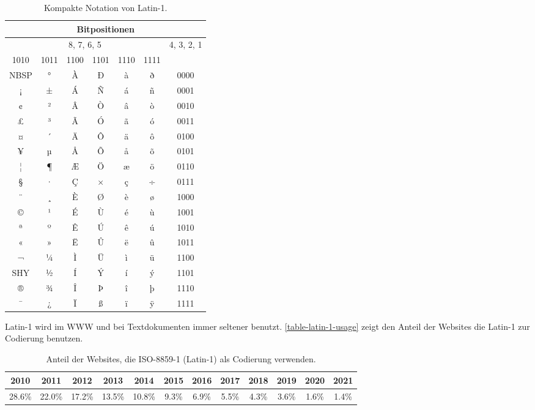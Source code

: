 \begin{table}[htb]
\centering
\begin{tabular}{|c|c|c|c|c|c||c|}
\hline
\multicolumn{7}{|c|}{Bitpositionen} \\ \hline
\multicolumn{6}{|c||}{8, 7, 6, 5} & 4, 3, 2, 1 \\ \hline \hline
1010 & 1011 & 1100 & 1101 & 1110 & 1111 & \\\hline
NBSP & ° & À & Ð & à & ð & 0000 \\ \hline 
¡   &  ±  &  Á   &  Ñ   &  á   &   ñ & 0001  \\ \hline 
¢   &  ²   &  Â   &   Ò  &   â  &   ò   & 0010   \\ \hline 
£   &  ³   &  Ã   &   Ó  &  ã   &    ó   & 0011    \\ \hline 
¤   &  ´   &  Ä   &   Ô  &  ä  &    ô  & 0100     \\ \hline 
¥   & µ    &  Å   &  Õ  &  å   &   õ    & 0101    \\ \hline 
¦   &   ¶  &  Æ   &  Ö  &  æ  &    ö   & 0110     \\ \hline 
§   &  ·   &  Ç   &  ×   &   ç  &   ÷   & 0111     \\ \hline 
¨   &  ¸   &   È  &   Ø  & è    &   ø    & 1000    \\ \hline 
©   &  ¹   &  É   &  Ù  &  é  &  ù   & 1001   \\ \hline 
ª   & º   & Ê   &  Ú  & ê   &  ú   & 1010       \\ \hline 
«   &  »   & Ë    &  Û   &  ë   &  û   & 1011      \\ \hline 
¬   &  ¼   & Ì    & Ü   & ì    &   ü   & 1100     \\ \hline 
SHY &  ½   &  Í   &  Ý   &  í   & ý   & 1101   \\ \hline 
®   &   ¾  &  Î   & Þ    &   î  &    þ   & 1110    \\ \hline 
¯   &  ¿   &  Ï   &  ß  &  ï   &   ÿ   & 1111     \\ \hline
\end{tabular}
\caption{Kompakte Notation von Latin-1.}
\label{table-latin-1-compact}
\end{table}

Latin-1 wird im \ac{WWW} und bei Textdokumenten immer seltener benutzt. \autoref{table-latin-1-usage} zeigt den Anteil der Websites die Latin-1 zur Codierung benutzen.

\begin{table}[htb]
\centering
\small
\begin{tabular}{|c|c|c|c|c|c|c|c|c|c|c|c|}
\hline
2010   & 2011   & 2012   & 2013   & 2014   & 2015  & 2016  & 2017  & 2018  & 2019  & 2020  & 2021 \\ \hline
28.6\% & 22.0\% & 17.2\% & 13.5\% & 10.8\% & 9.3\% & 6.9\% & 5.5\% & 4.3\% & 3.6\% & 1.6\% & 1.4\%       \\ \hline
\end{tabular}
\normalsize
\caption{Anteil der Websites, die ISO-8859-1 (Latin-1) als Codierung verwenden.}
\label{table-latin-1-usage}
\end{table}

